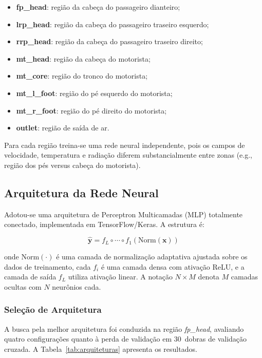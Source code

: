 \documentclass[12pt, a4paper]{article}
\begin{document}
\begin{itemize}
  \item \textbf{fp\_head}: região da cabeça do passageiro dianteiro;
  \item \textbf{lrp\_head}: região da cabeça do passageiro traseiro esquerdo;
  \item \textbf{rrp\_head}: região da cabeça do passageiro traseiro direito;
  \item \textbf{mt\_head}: região da cabeça do motorista;
  \item \textbf{mt\_core}: região do tronco do motorista;
  \item \textbf{mt\_l\_foot}: região do pé esquerdo do motorista;
  \item \textbf{mt\_r\_foot}: região do pé direito do motorista;
  \item \textbf{outlet}: região de saída de ar.
\end{itemize}

Para cada região treina-se uma rede neural independente, pois os campos de
velocidade, temperatura e radiação diferem substancialmente entre zonas
(e.g., região dos pés versus cabeça do motorista).

\subsection{Arquitetura da Rede Neural}
\label{sec:arquitetura}

Adotou-se uma arquitetura de Perceptron Multicamadas (MLP) totalmente
conectado, implementada em TensorFlow/Keras. A estrutura é:

\begin{equation}
  \hat{\mathbf{y}} = f_L \circ \cdots \circ f_1(\text{Norm}(\mathbf{x}))
  \label{eq:mlp}
\end{equation}

\noindent onde \(\text{Norm}(\cdot)\) é uma camada de normalização adaptativa
ajustada sobre os dados de treinamento, cada $f_i$ é uma camada densa com
ativação ReLU, e a camada de saída $f_L$ utiliza ativação linear.
A notação \(N \times M\) denota $M$ camadas ocultas com $N$ neurônios cada.

\subsubsection{Seleção de Arquitetura}
\label{sec:selecao_arq}

A busca pela melhor arquitetura foi conduzida na região \textit{fp\_head},
avaliando quatro configurações quanto à perda de validação em
30~dobras de validação cruzada. A Tabela~\ref{tab:arquiteturas} apresenta
os resultados.
\end{document}
